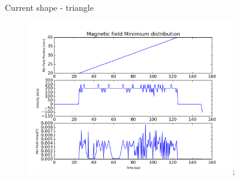 \documentclass[10pt, xcolor=dvipsnames]{beamer}
\begin{document}
\begin{frame}
  Current shape - triangle\\
  \begin{figure}
    \includegraphics[width = 0.8\textwidth]{triangle_toverlap_5};
  \end{figure}
\end{frame}
\end{document}
